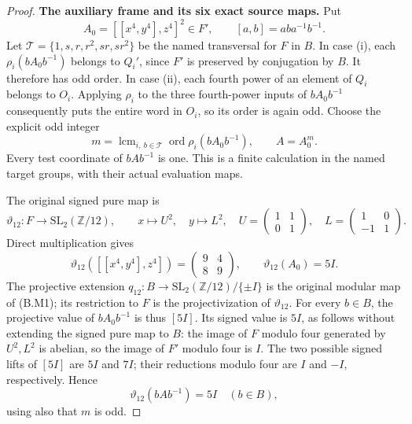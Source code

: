 \begin{proof}
\par\medskip\noindent\textbf{The auxiliary frame and its six exact source maps.}\quad
Put
\[
             A_0=[[x^4,y^4],z^4]^2\in F',
 \qquad [a,b]=aba^{-1}b^{-1}.
                                                               \tag{OGS.6}
\]
Let $\mathcal T=\{1,s,r,r^2,sr,sr^2\}$ be the named
transversal for $F$ in $B$.
In case (i), each $\rho_i(bA_0b^{-1})$ belongs to
$Q_i'$, since $F'$ is preserved by conjugation by $B$.
It therefore has odd order.
In case (ii), each fourth power of an element of
$Q_i$ belongs to $O_i$.
Applying $\rho_i$ to the three fourth-power inputs
of $bA_0b^{-1}$ consequently puts the entire word in
$O_i$, so its order is again odd.
Choose the explicit odd integer
\[
 m=\mathop{\mathrm{lcm}}_{i,\ b\in\mathcal T}
                    \operatorname{ord}\rho_i(bA_0b^{-1}),
 \qquad A=A_0^m.
                                                               \tag{OGS.7}
\]
Every test coordinate of $bAb^{-1}$ is one.
This is a finite calculation in the named target
groups, with their actual evaluation maps.

The original signed pure map is
\[
 \vartheta_{12}:F\to\mathrm{SL}_2(\mathbb Z/12),
 \qquad x\mapsto U^2,\quad y\mapsto L^2,\quad
 U=\begin{pmatrix}1&1\\0&1\end{pmatrix},\quad
 L=\begin{pmatrix}1&0\\-1&1\end{pmatrix}.
\]
Direct multiplication gives
\[
 \vartheta_{12}([[x^4,y^4],z^4])
       =\begin{pmatrix}9&4\\8&9\end{pmatrix},\qquad
 \vartheta_{12}(A_0)=5I .
                                                               \tag{OGS.8}
\]
The projective extension
$q_{12}:B\to\mathrm{SL}_2(\mathbb Z/12)/\{\pm I\}$
is the original modular map of (B.M1); its
restriction to $F$ is the projectivization of
$\vartheta_{12}$.
For every $b\in B$, the projective value of
$bA_0b^{-1}$ is thus $[5I]$.
Its signed value is $5I$, as follows without
extending the signed pure map to $B$:
the image of $F$ modulo four generated by $U^2,L^2$
is abelian, so the image of $F'$ modulo four is
$I$.  The two possible signed lifts of $[5I]$
are $5I$ and $7I$; their reductions modulo four
are $I$ and $-I$, respectively.
Hence
\[
          \vartheta_{12}(bAb^{-1})=5I
                       \quad(b\in B),
                                                               \tag{OGS.9}
\]
using also that $m$ is odd.


\end{proof}
